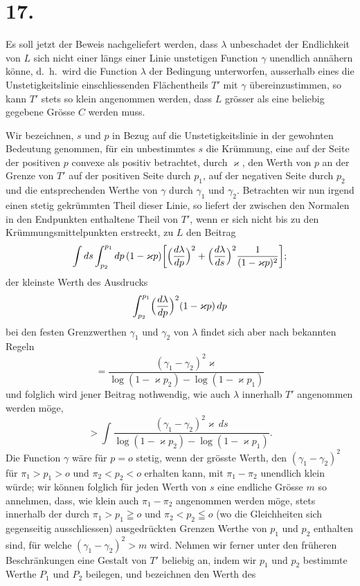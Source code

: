\documentclass{article}
\begin{document}
\section*{17.}

Es soll jetzt der Beweis nachgeliefert werden, dass $\lambda$ unbeschadet der Endlichkeit von $L$ sich nicht einer längs einer Linie unstetigen Function $\gamma$ unendlich annähern könne, d.\ h.\ wird die Function $\lambda$ der Bedingung unterworfen, ausserhalb eines die Unstetigkeitslinie einschliessenden Flächentheils $T'$ mit $\gamma$ übereinzustimmen, so kann $T'$ stets so klein angenommen werden, dass $L$ grösser als eine beliebig gegebene Grösse $C$ werden muss.

Wir bezeichnen, $s$ und $p$ in Bezug auf die Unstetigkeitslinie in der gewohnten Bedeutung genommen, für ein unbestimmtes $s$ die Krümmung, eine auf der Seite der positiven $p$ convexe als positiv betrachtet, durch $\varkappa$, den Werth von $p$ an der Grenze von $T'$ auf der positiven Seite durch $p_1$, auf der negativen Seite durch $p_2$ und die entsprechenden Werthe von $\gamma$ durch $\gamma_1$ und $\gamma_2$. Betrachten wir nun irgend einen stetig gekrümmten Theil dieser Linie, so liefert der zwischen den Normalen in den Endpunkten enthaltene Theil von $T'$, wenn er sich nicht bis zu den Krümmungsmittelpunkten erstreckt, zu $L$ den Beitrag
\[
\int ds \int_{p_2}^{p_1} dp\,(1 - \varkappa p) \biggl[\Bigl(\frac{d\lambda}{dp}\Bigr)^2 + \Bigl(\frac{d\lambda}{ds}\Bigr)^2 \frac{1}{(1 - \varkappa p)^2}\biggr];
\]
der kleinste Werth des Ausdrucks
\[
\int_{p_2}^{p_1} \Bigl(\frac{d\lambda}{dp}\Bigr)^2 (1 - \varkappa p)\,dp
\]
bei den festen Grenzwerthen $\gamma_1$ und $\gamma_2$ von $\lambda$ findet sich aber nach bekannten Regeln
\[
= \frac{(\gamma_1 - \gamma_2)^2 \varkappa}{\log(1 - \varkappa p_2) - \log(1 - \varkappa p_1)}
\]
und folglich wird jener Beitrag nothwendig, wie auch $\lambda$ innerhalb $T'$ angenommen werden möge,
\[
> \int \frac{(\gamma_1 - \gamma_2)^2 \varkappa\,ds}{\log(1 - \varkappa p_2) - \log(1 - \varkappa p_1)}.
\]
Die Function $\gamma$ wäre für $p = o$ stetig, wenn der grösste Werth, den $(\gamma_1 - \gamma_2)^2$ für $\pi_1 > p_1 > o$ und $\pi_2 < p_2 < o$ erhalten kann, mit $\pi_1 - \pi_2$ unendlich klein würde; wir können folglich für jeden Werth von $s$ eine endliche Grösse $m$ so annehmen, dass, wie klein auch $\pi_1 - \pi_2$ angenommen werden möge, stets innerhalb der durch $\pi_1 > p_1 \geqq o$ und $\pi_2 < p_2 \leqq o$ (wo die Gleichheiten sich gegenseitig ausschliessen) ausgedrückten Grenzen Werthe von $p_1$ und $p_2$ enthalten sind, für welche $(\gamma_1 - \gamma_2)^2 > m$ wird. Nehmen wir ferner unter den früheren Beschränkungen eine Gestalt von $T'$ beliebig an, indem wir $p_1$ und $p_2$ bestimmte Werthe $P_1$ und $P_2$ beilegen, und bezeichnen den Werth des
\end{document}
